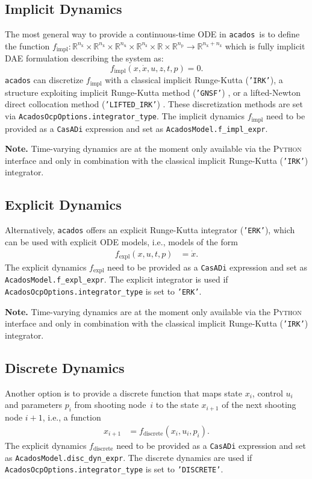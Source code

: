 \documentclass[english]{article}
\newcommand{\code}[1]{\texttt{#1}}
\newcommand{\casadi}{\texttt{CasADi}}
\newcommand{\acados}{\texttt{acados}}
\newcommand{\python}{\textsc{Python}}
\newcommand{\ind}[1]{_{\textrm{#1}}}
\newcommand{\nx}{n\ind{x}}
\newcommand{\nuu}{n\ind{u}}
\newcommand{\nz}{n\ind{z}}
\newcommand{\np}{n\ind{p}}
\begin{document}
\subsection{Implicit Dynamics}\label{sec:dynamics:implicit}
%
The most general way to provide a continuous-time ODE in \acados\ is to define the function $ f\ind{impl}: \mathbb{R}^{\nx}\times\mathbb{R}^{\nx}\times\mathbb{R}^{\nuu}\times\mathbb{R}^{\nz}\times\mathbb{R} \times \mathbb{R}^{\np} \rightarrow \mathbb{R}^{\nx+\nz}$ which is fully implicit DAE formulation describing the system as:
\begin{equation}
    f\ind{impl}(x, \dot{x}, u, z, t, p) = 0.\label{eq:dynamics:implicit}
\end{equation}
\acados{} can discretize $ f\ind{impl} $ with a classical implicit Runge-Kutta (\code{'IRK'}), a structure exploiting implicit Runge-Kutta method (\code{'GNSF'}) \cite{Frey2019}, or a lifted-Newton direct collocation method (\code{'LIFTED\_IRK'}) \cite{Quirynen2015a}.
These discretization methods are set via \code{AcadosOcpOptions.integrator\_type}.
The implicit dynamics $f\ind{impl}$ need to be provided as a \casadi{} expression and set as \code{AcadosModel.f\_impl\_expr}.

\textbf{Note.} Time-varying dynamics are at the moment only available via the \python{} interface and only in combination with the classical implicit Runge-Kutta (\code{'IRK'}) integrator.
%
\subsection{Explicit Dynamics}\label{sec:dynamics:explicit}
%
Alternatively, \acados{} offers an explicit Runge-Kutta integrator (\code{'ERK'}), which can be used with explicit ODE models, i.e., models of the form
\begin{align}
f\ind{expl}(x,u,t,p) &= \dot{x}.\label{eq:dynamics:explicit}
\end{align}
The explicit dynamics $f\ind{expl}$ need to be provided as a \casadi{} expression and set as \code{AcadosModel.f\_expl\_expr}.
The explicit integrator is used if \code{AcadosOcpOptions.integrator\_type} is set to \code{'ERK'}.

\textbf{Note.} Time-varying dynamics are at the moment only available via the \python{} interface and only in combination with the classical implicit Runge-Kutta (\code{'IRK'}) integrator.

%
\subsection{Discrete Dynamics}\label{sec:dynamics:discrete}
%
Another option is to provide a discrete function that maps state $x_i$, control $u_i$ and parameters $p_i$ from shooting node~$i$ to the state $x_{i+1}$ of the next shooting node $i+1$, i.e., a function
\begin{align}
x_{i+1} &= f\ind{discrete}(x_i,u_i,p_i).\label{eq:dynamics:discrete}
\end{align}
The explicit dynamics $f\ind{discrete}$ need to be provided as a \casadi{} expression and set as \code{AcadosModel.disc\_dyn\_expr}.
The discrete dynamics are used if \code{AcadosOcpOptions.integrator\_type} is set to \code{'DISCRETE'}.
\end{document}
